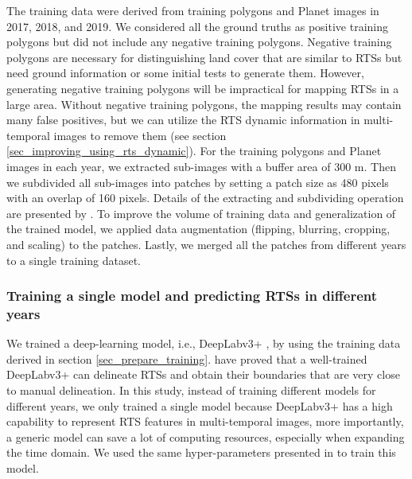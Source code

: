 \documentclass[authoryear,preprint,review,12pt]{elsarticle}
\begin{document}

The training data were derived from training polygons and Planet images in 2017, 2018, and 2019. 
We considered all the ground truths as positive training polygons but did not include any negative training polygons. 
Negative training polygons are necessary for distinguishing land cover that are similar to RTSs but need ground information or some initial tests to generate them. 
However, generating negative training polygons will be impractical for mapping RTSs in a large area. 
Without negative training polygons, the mapping results may contain many false positives, but we can utilize the RTS dynamic information in multi-temporal images to remove them (see section \ref{sec_improving_using_rts_dynamic}).
For the training polygons and Planet images in each year, we extracted sub-images with a buffer area of 300 m. 
Then we subdivided all sub-images into patches by setting a patch size as 480 pixels with an overlap of 160 pixels. 
Details of the extracting and subdividing operation are presented by \cite{huang2018automatic}.
To improve the volume of training data and generalization of the trained model, we applied data augmentation (flipping, blurring, cropping, and scaling) to the patches. 
Lastly, we merged all the patches from different years to a single training dataset. 


\subsubsection{Training a single model and predicting RTSs in different years}
\label{sec_train_prediction}

We trained a deep-learning model, i.e., DeepLabv3+ \citep{chen2018encoder-decoder}, by using the training data derived in section \ref{sec_prepare_training}. 
\cite{huang2020using} have proved that a well-trained DeepLabv3+ can delineate RTSs and obtain their boundaries that are very close to manual delineation. 
In this study, instead of training different models for different years, we only trained a single model because DeepLabv3+ has a high capability to represent RTS features in multi-temporal images, more importantly, a generic model can save a lot of computing resources, especially when expanding the time domain.
We used the same hyper-parameters presented in \cite{huang2020using} to train this model. 
\end{document}
